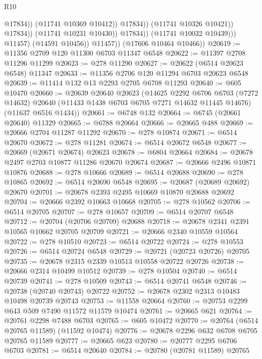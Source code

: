 \begin{lexlean}{R10}
\begin{coremodule}
                                        @17834))
                                    (@11741 @10369 @10412))
                                  @17834))
                              (@11741 @10326 @10421))
                            @17834))
                        (@11741 @10231 @10430))
                      @17834))
                  (@11741 @10032 @10439)))
              @11457)
            (@14591 @10456))
          @11457))
      (@17606 @10464 @10466))
@20619 := @11356 @2709 @120 @11300 @6703 @11347 @6548
@20622 := @11397 @2708 @11296 @11299
@20623 := @278 @11290
@20627 := @20622 (@6514 @20623 @6548) @11347
@20633 := @11356 @2706 @120 @11294 @6703 @20623 @6548
@20639 := @11414 @132 @13 @2293 @2705 @6708 @11293
@20640 := @605 @10470
@20660 := @20639
    @20640
    @20623
    (@14625
      @2292
      @6706
      @6703
      (@7272 @14632)
      @20640
      (@11433 @1438 @6703 @6705 @7271 @14632 @11445 @14676)
      (@11637 @6516 @1434))
@20661 := @6748 @132
@20664 := @6745 (@20661 @20640) @11329
@20665 := @6788 @20664
@20666 := @20665 @488
@20669 := @20666 @2704 @11287 @11292
@20670 := @278 @10874
@20671 := @6514 @20670
@20672 := @278 @11281
@20674 := @6514 @20672 @6548
@20677 := @20669 (@20671 @20674) @20623
@20678 := @6804 @20664
@20684 := @20678 @2497 @2703 @10877 @11286 @20670 @20674
@20687 := @20666 @2496 @10871 @10876
@20688 := @278 @10666
@20689 := @6514 @20688
@20690 := @278 @10865
@20692 := @6514 @20690 @6548
@20695 := @20687 (@20689 @20692) @20670
@20701 := @20678 @2393 @2495 @10669 @10870 @20688 @20692
@20704 := @20666 @2392 @10663 @10668
@20705 := @278 @10562
@20706 := @6514 @20705
@20707 := @278 @10657
@20709 := @6514 @20707 @6548
@20712 := @20704 (@20706 @20709) @20688
@20718 := @20678 @2341 @2391 @10565 @10662 @20705 @20709
@20721 := @20666 @2340 @10559 @10564
@20722 := @278 @10510
@20723 := @6514 @20722
@20724 := @278 @10553
@20726 := @6514 @20724 @6548
@20729 := @20721 (@20723 @20726) @20705
@20735 := @20678 @2315 @2339 @10513 @10558 @20722 @20726
@20738 := @20666 @2314 @10499 @10512
@20739 := @278 @10504
@20740 := @6514 @20739
@20741 := @278 @10509
@20743 := @6514 @20741 @6548
@20746 := @20738 (@20740 @20743) @20722
@20752 := @20678 @2302 @2313 @10483 @10498 @20739 @20743
@20753 := @11558 @20664
@20760 := @20753 @2299 @643 @509 @7490 @11572 @11579 @10474
@20761 := @20665 @621
@20764 := @20761 @2298 @7488 @6703
@20765 := @605 @10472
@20770 := @20764 (@6514 @20765 @11589) (@11592 @10474)
@20776 := @20678 @2296 @632 @6708 @6705 @20765 @11589
@20777 := @20665 @623
@20780 := @20777 @2295 @6706 @6703
@20781 := @6514 @20640
@20784 := @20780 (@20781 @11589) @20765

\end{coremodule}
\end{lexlean}
